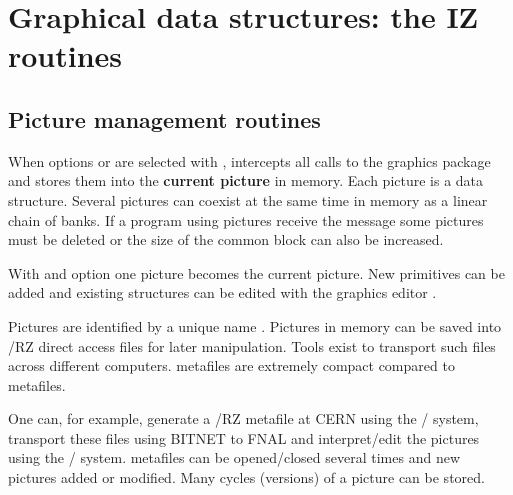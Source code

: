 \chapter{Graphical data structures: the IZ routines}
\section{Picture management routines}

When options  or  are selected with , \HIGZ{}
intercepts all calls to the graphics package and stores them into the
{\bf current picture} in memory. Each picture is a \ZEBRA{} data structure.
Several pictures can coexist at the same time in memory as a \ZEBRA{} linear
chain of banks. If a program using pictures receive the message
 some pictures must be deleted or the size
of the  common block can also be increased.

With  and option  one picture becomes the current picture.
New primitives can be added and existing structures can be edited
with the graphics editor .

Pictures are identified by a unique name .
Pictures in memory can be saved into \ZEBRA/RZ direct access files
for later manipulation.
Tools exist to transport such files across different computers.
\HIGZ{} metafiles are extremely compact compared to \GKS{} metafiles.

One can, for example, generate a \HIGZ/RZ metafile at CERN using
the \HIGZ/\GKSGRAL{} system, transport these files using BITNET
to FNAL and interpret/edit the pictures using the \HIGZ/ system.
\HIGZ{} metafiles can be opened/closed several times and new pictures
added or modified. Many cycles (versions) of a picture can be stored.

